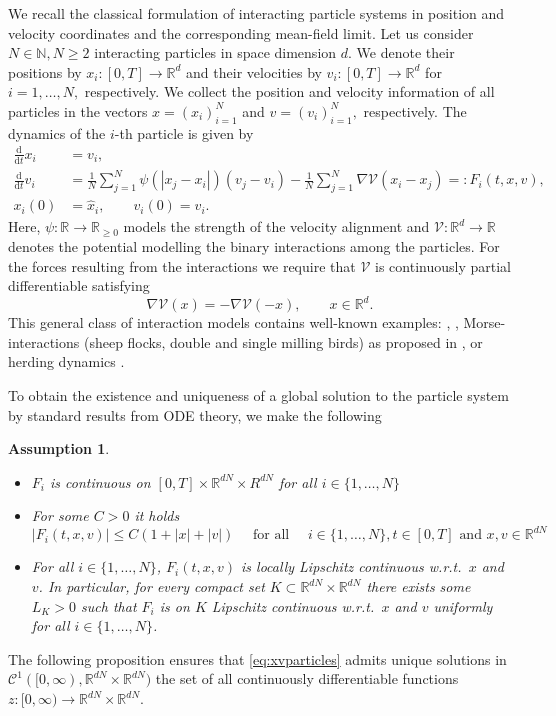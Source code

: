\documentclass[11pt]{article}
\newtheorem{assumption}[theorem]{Assumption}
\newcommand{\R}[0]{\mathbb R}
\newcommand{\N}[0]{\mathbb N}
\newcommand{\calC}[0]{\mathcal C}
\newcommand{\dd}[0]{\mathrm d}
\newcommand{\sumj}[0]{\sum_{j=1}^N}
\newcommand{\V}[0]{\mathcal V}
\begin{document}
\begin{bibunit}[abbrv]
We recall the classical formulation of interacting particle systems in position and velocity coordinates and the corresponding mean-field limit. Let us consider $N\in\N, N\ge2$ interacting particles in space dimension $d.$ We denote their positions by $x_i \colon [0,T]\rightarrow \R^d$ and their velocities by $v_i \colon [0,T]\rightarrow \R^d$ for $i=1,\dots,N,$ respectively. We collect the position and velocity information of all particles in the vectors $x=(x_i)_{i=1}^N$ and $v=(v_i)_{i=1}^N,$ respectively. The dynamics of the $i$-th particle is given by
\begin{subequations} \label{eq:xvparticles}
\begin{align}
    \frac{\dd}{\dd t} x_i &= v_i, \\
    \frac{\dd}{\dd t} v_i &= \frac{1}{N}\sumj \psi(|x_j - x_i|)(v_j - v_i) - \frac{1}{N} \sumj \nabla \V(x_i - x_j)=:F_i(t,x,v), \\
    x_i(0) &= \hat x_i, \qquad v_i(0) = \hat v_i.
\end{align}
\end{subequations}
Here, $\psi \colon \R \rightarrow \R_{\ge 0}$ models the strength of the velocity alignment and $\V \colon \R^d  \rightarrow \R$ denotes the potential modelling the binary interactions among the particles.  
For the forces resulting from the interactions we require that $\V$ is continuously partial differentiable satisfying  
\begin{equation}\label{eq:antisymm}
\nabla \V(x) = - \nabla \V(-x), \qquad x\in \R^d.
\end{equation}
This general class of interaction models contains  well-known examples:
\cite{CuckerSmale}, \cite{Matei},  Morse-interactions (sheep flocks, double and single milling birds) as proposed in \cite{Dorsogna2006self}, or herding dynamics \cite{Totzeck}. 

To obtain the existence and uniqueness of a global solution to the particle system by standard results from ODE theory, we make the following
\begin{assumption}\label{ass:particle}
\begin{itemize}
    \item [(1)] $F_i$ is continuous on $[0,T] \times \R^{dN} \times R^{dN}$ for all $i\in\{1,\dots,N\}$
    \item [(2)] For some $C>0$ it holds
    \[|F_i(t,x,v)| \le C(1+|x|+|v|) \quad \text{ for all }\quad i\in\{1,\dots,N\}, t\in[0,T] \text{ and } x,v\in \R^{dN}\]
    \item [(3)] For all $i\in\{1,\dots,N\}$, $F_i(t,x,v)$ is locally Lipschitz continuous w.r.t.~$x$ and $v$. In particular, for every compact set $K \subset \R^{dN} \times \R^{dN}$ there exists some $L_K>0$ such that 
    $F_i$ is on $K$ Lipschitz continuous  w.r.t.~$x$ and $v$ uniformly for all  $i\in\{1,\dots,N\}$.
\end{itemize}
\end{assumption}
\noindent
The following proposition ensures that \eqref{eq:xvparticles} admits unique solutions in $\calC^1([0,\infty),\R^{dN}\times\R^{dN})$ the set of all continuously differentiable functions $z:[0,\infty)\rightarrow \R^{dN}\times\R^{dN}$.


\end{bibunit}
\end{document}
